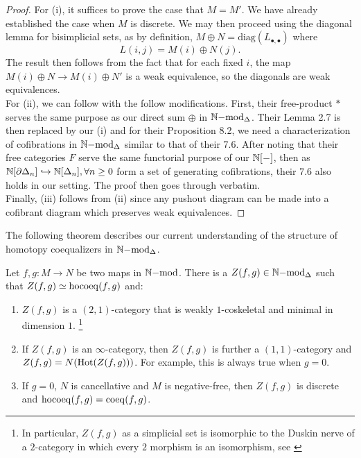 \begin{proof}
For (i), it suffices to prove the case that $M=M'$. We have already established the case when $M$ is discrete.
We may then proceed using the diagonal lemma for bisimplicial sets, as by definition, $M \oplus N = \mathrm{diag}(L_{\bullet, \bullet})$ where
\[L(i,j) = M(i) \oplus N(j).\]
The result then follows from the fact that for each fixed $i$, the map $M(i) \oplus N \to M(i) \oplus N'$ is a weak equivalence, so the diagonals
are weak equivalences.\\
\indent For (ii), we can follow \cite[Proposition 8.1]{kansemi} with the follow modifications. First, their free-product $*$ serves the same purpose as
our direct sum $\oplus$ in ${\mathbb{N}\mathrm{-mod}}_{\Delta}$. Their Lemma 2.7 is then replaced by our (i) and for their Proposition 8.2, we need
a characterization of cofibrations in ${\mathbb{N}\mathrm{-mod}}_{\Delta}$ similar to that of their 7.6. After noting that their free categories $F$ serve
the same functorial purpose of our $\mathbb{N}[-]$, then as $\mathbb{N}[\partial \Delta_n] \hookrightarrow \mathbb{N}[\Delta_n], \forall n \ge 0$ form a set of generating cofibrations,
their 7.6 also holds in our setting. The proof then goes through verbatim.\\
\indent Finally, (iii) follows from (ii) since any pushout diagram can be made into a cofibrant diagram which preserves weak equivalences.
\end{proof}
The following theorem describes our current understanding of the structure of homotopy coequalizers in ${\mathbb{N}\mathrm{-mod}}_{\Delta}$.
\begin{theorem}\label{thm:main0}
Let $f,g: M \to N$ be two maps in $\mathbb{N}\mathrm{-mod}$. There is a $Z(f,g) \in {\mathbb{N}\mathrm{-mod}}_{\Delta}$ such that $Z(f,g) \simeq \operatorname{hocoeq}(f,g)$ and:
\begin{enumerate}
\item[(i)] $Z(f,g)$ is a $(2,1)$-category that is weakly $1$-coskeletal and minimal in dimension $1$.
\footnote{In particular, $Z(f,g)$ as a simplicial set is isomorphic to the Duskin nerve of a $2$-category in which every 
$2$ morphism is an isomorphism, see \cite[4.8.1.5]{keradon}}
\item[(ii)] If $Z(f,g)$ is an $\infty$-category, then $Z(f,g)$ is further a $(1,1)$-category and $Z(f,g)=N(\operatorname{Hot}(Z(f,g)))$. For example, this is always true when $g=0$.
\item[(iii)] If $g=0$, $N$ is cancellative and $M$ is negative-free, then $Z(f,g)$ is discrete and $\operatorname{hocoeq}(f,g)=\operatorname{coeq}(f,g)$.
\end{enumerate}
\end{theorem}
